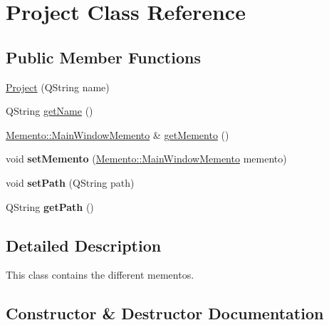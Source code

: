 \hypertarget{classModel_1_1Project}{}\section{Project Class Reference}
\label{classModel_1_1Project}
\subsection*{Public Member Functions}
\begin{DoxyCompactItemize}
\item 
\hyperlink{classModel_1_1Project_ae247a6a7beaace2e9d2637521160002c}{Project} (Q\+String name)
\item 
Q\+String \hyperlink{classModel_1_1Project_ab6b223a95a460d422d940396d9a5657b}{get\+Name} ()
\item 
\hyperlink{classMemento_1_1MainWindowMemento}{Memento\+::\+Main\+Window\+Memento} \& \hyperlink{classModel_1_1Project_a439f54da110f371207bbedac6fe64bf0}{get\+Memento} ()
\item 
\hypertarget{classModel_1_1Project_a06dcc543cbe7f60ea6a1da13d2585964}{}void {\bfseries set\+Memento} (\hyperlink{classMemento_1_1MainWindowMemento}{Memento\+::\+Main\+Window\+Memento} memento)\label{classModel_1_1Project_a06dcc543cbe7f60ea6a1da13d2585964}

\item 
\hypertarget{classModel_1_1Project_a41d3b419f9a56edd2854fb27715c94d5}{}void {\bfseries set\+Path} (Q\+String path)\label{classModel_1_1Project_a41d3b419f9a56edd2854fb27715c94d5}

\item 
\hypertarget{classModel_1_1Project_a1a94d0c9bf9dd725556721ac914025e3}{}Q\+String {\bfseries get\+Path} ()\label{classModel_1_1Project_a1a94d0c9bf9dd725556721ac914025e3}

\end{DoxyCompactItemize}


\subsection{Detailed Description}
This class contains the different mementos. 

\subsection{Constructor \& Destructor Documentation}
\hypertarget{classModel_1_1Project_ae247a6a7beaace2e9d2637521160002c}{}
